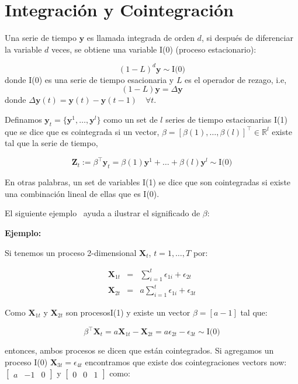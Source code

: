 \section{Integración y Cointegración}
Una serie de tiempo $\mathbf{y}$ es llamada integrada de orden $d$, si después
de diferenciar la variable $d$ veces, se obtiene una variable I(0) (proceso
estacionario):

\[
(1-L)^d \mathbf{y} \sim \text{I(0)}
\]
\noindent donde I(0) es una serie de tiempo esacionaria y $L$ es el operador de rezago, i.e,
\[
(1-L)\mathbf{y} = \Delta \mathbf{y}
\]
\noindent donde $\Delta \mathbf{y}(t) = \mathbf{y}(t)  -\mathbf{y}(t-1) \quad \forall t $.

Definamos $\mathbf{y}_t = \{\mathbf{y}^1, \dots, \mathbf{y}^l\}$ como un set de $l$ series de tiempo estacionarias 
I(1) que se dice que es cointegrada si un vector,
$\beta=[\beta(1),\dots,\beta(l)]^\intercal \in \mathbb{R}^l$  existe tal que la serie de tiempo, 

\begin{equation}
 \mathbf{Z}_t:= \beta^\intercal \mathbf{y}_t = \beta(1) \mathbf{y}^1 + \dots + \beta(l) \mathbf{y}^l \sim
  \text{I(0)}
  \end{equation}

En otras palabras, un set de variables I(1) se dice que son cointegradas si
existe una combinación lineal de ellas que es I(0).

El siguiente ejemplo~\cite{johansen1995} ayuda a ilustrar el significado de
$\beta$:

\textbf{Ejemplo:}

Si tenemos un proceso 2-dimensional $\mathbf{X}_t$, $t=1,\dots,T$ por:

\begin{eqnarray*}
\mathbf{X}_{1t} &=& \sum_{i=1}^t \epsilon_{1i} + \epsilon_{2t} \\
\mathbf{X}_{2t} &=& a \sum_{i=1}^t \epsilon_{1i} + \epsilon_{3t} 
\end{eqnarray*}

Como $\mathbf{X}_{1t}$ y $\mathbf{X}_{2t}$ son procesosI(1) y existe un vector
$\beta = [a -1]$ tal que:

\[
\beta^\intercal \mathbf{X}_t = a \mathbf{X}_{1t} -\mathbf{X}_{2t} = 
a\epsilon_{2t} - \epsilon_{3t} \sim \text{I(0)}
\]

entonces, ambos procesos se dicen que están cointegrados. Si agregamos un proceso I(0)
$\mathbf{X}_{3t} = \epsilon_{4t}$ encontramos que existe dos cointegraciones
vectors now: $\begin{bmatrix}a &-1& 0\end{bmatrix}$ y $\begin{bmatrix}0
&0&1\end{bmatrix}$ como:

